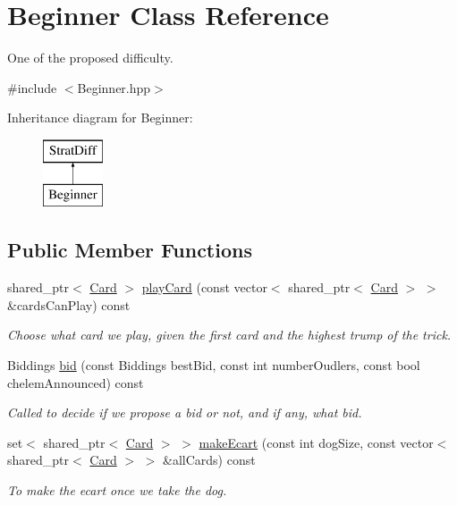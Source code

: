 \hypertarget{classBeginner}{\section{\-Beginner \-Class \-Reference}
\label{classBeginner}
}


\-One of the proposed difficulty.  




{\ttfamily \#include $<$\-Beginner.\-hpp$>$}

\-Inheritance diagram for \-Beginner\-:\begin{figure}[H]
\begin{center}
\leavevmode
\includegraphics[height=2.000000cm]{classBeginner}
\end{center}
\end{figure}
\subsection*{\-Public \-Member \-Functions}
\begin{DoxyCompactItemize}
\item 
shared\-\_\-ptr$<$ \hyperlink{classCard}{\-Card} $>$ \hyperlink{classBeginner_a73e2bf8d807166c994c42fd3b6bfc7bf}{play\-Card} (const vector$<$ shared\-\_\-ptr$<$ \hyperlink{classCard}{\-Card} $>$ $>$ \&cards\-Can\-Play) const 
\begin{DoxyCompactList}\small\item\em \-Choose what card we play, given the first card and the highest trump of the trick. \end{DoxyCompactList}\item 
\-Biddings \hyperlink{classBeginner_ad051797028f352b16df271fb24c435f6}{bid} (const \-Biddings best\-Bid, const int number\-Oudlers, const bool chelem\-Announced) const 
\begin{DoxyCompactList}\small\item\em \-Called to decide if we propose a bid or not, and if any, what bid. \end{DoxyCompactList}\item 
set$<$ shared\-\_\-ptr$<$ \hyperlink{classCard}{\-Card} $>$ $>$ \hyperlink{classBeginner_a7817d38e018ac5e1d9dbb42923ef0752}{make\-Ecart} (const int dog\-Size, const vector$<$ shared\-\_\-ptr$<$ \hyperlink{classCard}{\-Card} $>$ $>$ \&all\-Cards) const 
\begin{DoxyCompactList}\small\item\em \-To make the ecart once we take the dog. \end{DoxyCompactList}\end{DoxyCompactItemize}


